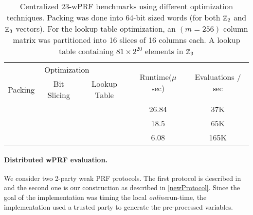 \begin{table}[h]
	{
		\centering
		\begin{tabular}{|c|c|c|c|c|}
			
			\hline
			\multicolumn{3}{|c|}{Optimization} &  \multirow{2}{*}{Runtime($\mu$ sec)} & \multirow{2}{*}{Evaluations / sec} \\
			Packing & Bit Slicing & Lookup Table &  & \\
			\hline\hline
			\checkmark & & & 26.84 & 37K\\
			\checkmark & \checkmark & & 18.5 & 65K \\
			\checkmark & \checkmark & \checkmark & 6.08 & 165K \\
			\hline
		\end{tabular}
		\caption{Centralized 23-wPRF benchmarks using different optimization techniques. Packing was done into 64-bit sized words (for both $\mathbb{Z}_2$ and $\mathbb{Z}_3$ vectors). For the lookup table optimization, an $(m=256)$-column matrix was partitioned into 16 slices of 16 columns each. A lookup table containing $81 \times 2^{20}$ elements in $\mathbb{Z}_3$}
		\label{table:optimization_benchmarks}
	}
\end{table}

\paragraph{Distributed wPRF evaluation.}
We consider two 2-party weak PRF protocols. The first protocol is described in \cite{boneh2018-darkmatter} and the second one is our construction as described in \ref{newProtocol}. Since the goal of the implementation was timing the local {\em online}run-time, the implementation used a trusted party to generate the pre-processed variables.

